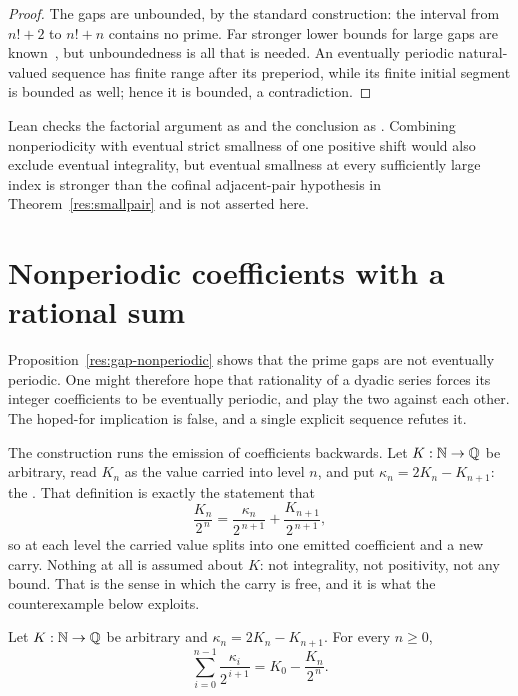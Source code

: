 \documentclass[11pt]{article}
\begin{document}
\begin{proof}
The gaps are unbounded, by the standard construction: the interval from $n!+2$
to $n!+n$ contains no prime.  Far stronger lower bounds for large gaps are
known~\cite[Theorem~1, p.~66]{fgkmt2018}, but unboundedness is all that is
needed.  An
eventually periodic natural-valued sequence has finite range after its
preperiod, while its finite initial segment is bounded as well; hence it is
bounded, a contradiction.
\end{proof}

\noindent Lean checks the factorial argument as
 and the conclusion as
.  Combining nonperiodicity with eventual strict smallness of one
positive shift would also exclude eventual integrality, but eventual
smallness at every sufficiently large index is stronger than the cofinal
adjacent-pair hypothesis in Theorem~\ref{res:smallpair} and is not asserted
here.

\section{Nonperiodic coefficients with a rational sum}\label{sec:carry}

Proposition~\ref{res:gap-nonperiodic} shows that the prime gaps are not
eventually periodic.  One might therefore hope that rationality of a dyadic
series forces its integer coefficients to be eventually periodic, and play the
two against each other.  The hoped-for implication is false, and a single
explicit sequence refutes it.

The construction runs the emission of coefficients backwards.  Let
$K:\mathbb{N}\to\mathbb{Q}$ be arbitrary, read $K_n$ as the value carried into level $n$, and
put $\kappa_n=2K_n-K_{n+1}$: the
.
That definition is exactly the statement that
\[
 \frac{K_n}{2^{\,n}}
 =\frac{\kappa_n}{2^{\,n+1}}+\frac{K_{n+1}}{2^{\,n+1}} ,
\]
so at each level the carried value splits into one emitted coefficient and a
new carry.  Nothing at all is assumed about $K$: not integrality, not
positivity, not any bound.  That is the sense in which the carry is free, and
it is what the counterexample below exploits.

\begin{proposition}\label{res:telescope}
Let $K:\mathbb{N}\to\mathbb{Q}$ be arbitrary and $\kappa_n=2K_n-K_{n+1}$.  For every $n\ge0$,
\[
 \sum_{i=0}^{n-1}\frac{\kappa_i}{2^{\,i+1}}=K_0-\frac{K_n}{2^{\,n}} .
\]
\end{proposition}
\end{document}
